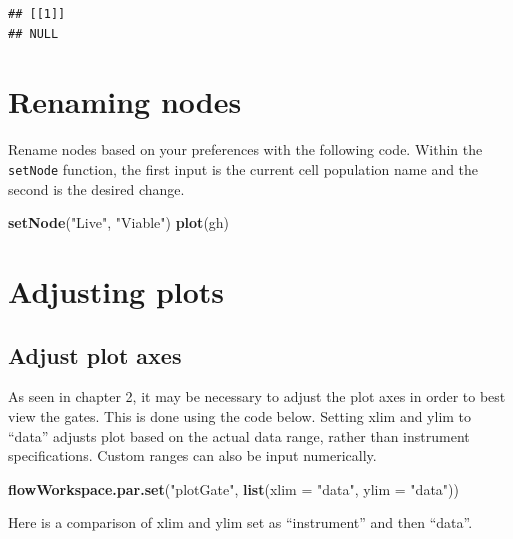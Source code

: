 \documentclass[]{book}
\newenvironment{Shaded}{\begin{snugshade}}{\end{snugshade}}
\newcommand{\DataTypeTok}[1]{\textcolor[rgb]{0.13,0.29,0.53}{#1}}
\newcommand{\KeywordTok}[1]{\textcolor[rgb]{0.13,0.29,0.53}{\textbf{#1}}}
\newcommand{\NormalTok}[1]{#1}
\newcommand{\StringTok}[1]{\textcolor[rgb]{0.31,0.60,0.02}{#1}}
\begin{document}
\begin{verbatim}
## [[1]]
## NULL
\end{verbatim}

\hypertarget{renaming-nodes}{%
\section{Renaming nodes}\label{renaming-nodes}}

Rename nodes based on your preferences with the following code. Within the \texttt{setNode} function, the first input is the current cell population name and the second is the desired change.

\begin{Shaded}
\begin{Highlighting}[]
\KeywordTok{setNode}\NormalTok{(}\StringTok{"Live"}\NormalTok{, }\StringTok{"Viable"}\NormalTok{)}
\KeywordTok{plot}\NormalTok{(gh)}
\end{Highlighting}
\end{Shaded}

\hypertarget{adjusting-plots}{%
\section{Adjusting plots}\label{adjusting-plots}}

\hypertarget{adjust-plot-axes}{%
\subsection{Adjust plot axes}\label{adjust-plot-axes}}

As seen in chapter 2, it may be necessary to adjust the plot axes in order to best view the gates. This is done using the code below. Setting xlim and ylim to ``data'' adjusts plot based on the actual data range, rather than instrument specifications. Custom ranges can also be input numerically.

\begin{Shaded}
\begin{Highlighting}[]
\KeywordTok{flowWorkspace.par.set}\NormalTok{(}\StringTok{"plotGate"}\NormalTok{, }\KeywordTok{list}\NormalTok{(}\DataTypeTok{xlim =} \StringTok{"data"}\NormalTok{,}
                                       \DataTypeTok{ylim =} \StringTok{"data"}\NormalTok{))}
\end{Highlighting}
\end{Shaded}

Here is a comparison of xlim and ylim set as ``instrument'' and then ``data''.
\end{document}
